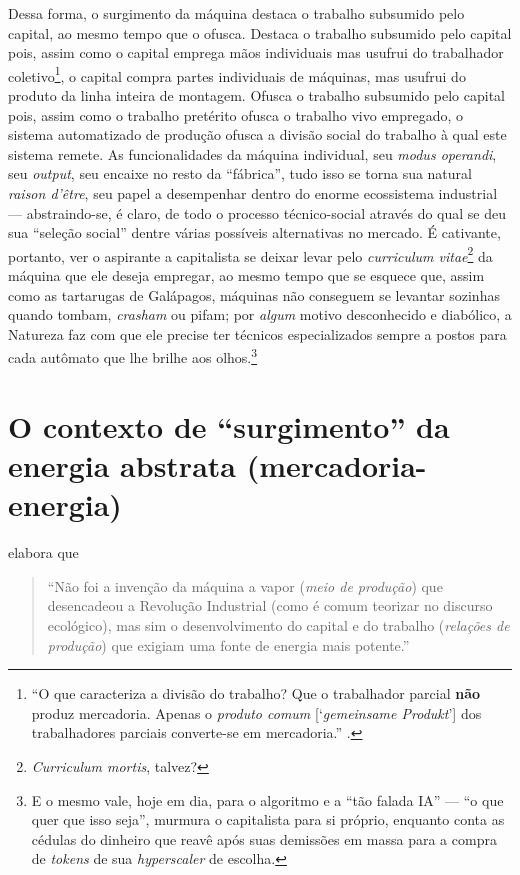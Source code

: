 \documentclass[12pt]{article}
\numberwithin{equation}{section}
\theoremstyle{plain}
\theoremstyle{definition}
\theoremstyle{remark}
\begin{document}
Dessa forma, o surgimento da máquina destaca o trabalho subsumido pelo capital, ao mesmo tempo que o ofusca. Destaca o trabalho subsumido pelo capital pois, assim como o capital emprega mãos individuais mas usufrui do trabalhador coletivo\footnote{``O que caracteriza a divisão do trabalho? Que o trabalhador parcial \textbf{não} produz mercadoria. Apenas o \emph{produto comum} {[}`\emph{gemeinsame Produkt}'{]} dos trabalhadores parciais converte-se em mercadoria.'' \parencite[p. 429, grifo e adendo meus]{Marx2017}.}, o capital compra partes individuais de máquinas, mas usufrui do produto da linha inteira de montagem. Ofusca o trabalho subsumido pelo capital pois, assim como o trabalho pretérito ofusca o trabalho vivo empregado, o sistema automatizado de produção ofusca a divisão social do trabalho à qual este sistema remete. As funcionalidades da máquina individual, seu \emph{modus operandi}, seu \emph{output}, seu encaixe no resto da ``fábrica'', tudo isso se torna sua natural \emph{raison d'être}, seu papel a desempenhar dentro do enorme ecossistema industrial --- abstraindo-se, é claro, de todo o processo técnico-social através do qual se deu sua ``seleção social'' dentre várias possíveis alternativas no mercado. É cativante, portanto, ver o aspirante a capitalista se deixar levar pelo \emph{curriculum vitae}\footnote{\emph{Curriculum mortis}, talvez?} da máquina que ele deseja empregar, ao mesmo tempo que se esquece que, assim como as tartarugas de Galápagos, máquinas não conseguem se levantar sozinhas quando tombam, \emph{crasham} ou pifam; por \emph{algum} motivo desconhecido e diabólico, a Natureza faz com que ele precise ter técnicos especializados sempre a postos para cada autômato que lhe brilhe aos olhos.\footnote{E o mesmo vale, hoje em dia, para o algoritmo e a ``tão falada IA'' --- ``o que quer que isso seja'', murmura o capitalista para si próprio, enquanto conta as cédulas do dinheiro que reavê após suas demissões em massa para a compra de \emph{tokens} de sua \emph{hyperscaler} de escolha.}

\hypertarget{o-contexto-de-surgimento-da-energia-abstrata-mercadoria-energia}{%
\section{O contexto de ``surgimento'' da energia abstrata (mercadoria-energia)}\label{o-contexto-de-surgimento-da-energia-abstrata-mercadoria-energia}}

\textcite{Pasquinelli2023} elabora que

\begin{quote}
``Não foi a invenção da máquina a vapor (\emph{meio de produção}) que desencadeou a Revolução Industrial (como é comum teorizar no discurso ecológico), mas sim o desenvolvimento do capital e do trabalho (\emph{relações de produção}) que exigiam uma fonte de energia mais potente.'' \parencite[p. 107]{Pasquinelli2023}
\end{quote}
\end{document}
